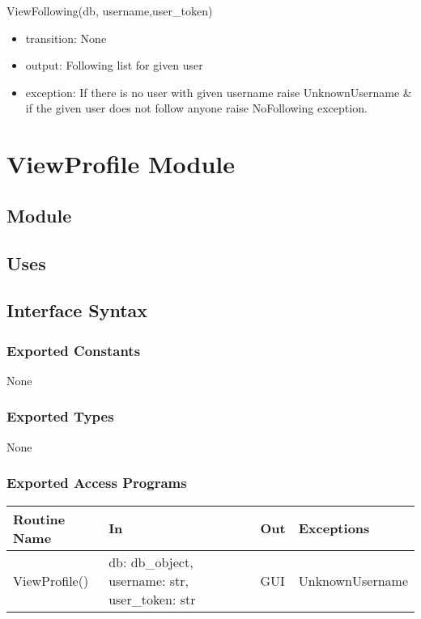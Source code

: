 \documentclass[12pt, titlepage]{article}
\begin{document}
ViewFollowing(db, username,user\_token)
\begin{itemize}
    \item transition: None
    \item output: Following list for given user
    \item exception: If there is no user with given username raise UnknownUsername \& if the given user does not follow anyone raise NoFollowing exception.
\end{itemize}



\newpage
\section* {ViewProfile Module}
\subsection*{Module}

\subsection* {Uses}


\subsection* {Interface Syntax}
\subsubsection* {Exported Constants}
None

\subsubsection* {Exported Types}
None

\subsubsection* {Exported Access Programs}
\begin{table}[!htb]
    \centering
    \begin{tabular}{|p{3cm}|p{3cm}|p{3cm}|p{4.5cm}|}
        \hline
        \textbf{Routine Name} & \textbf{In} & \textbf{Out} & \textbf{Exceptions} \\
        \hline
         ViewProfile() & db: db\_object, username: str, user\_token: str  & GUI & UnknownUsername\\
        \hline
    \end{tabular}
\end{table}
\end{document}

